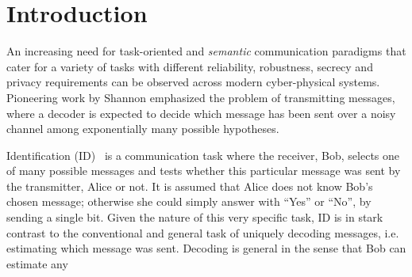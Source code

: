\documentclass[conference,final]{IEEEtran}
\begin{document}
\begin{abstract}
An upper bound to the identification capacity of discrete memoryless wiretap channels is derived under the requirement of semantic effective secrecy, combining semantic secrecy and stealth constraints. A previously established lower bound is improved by applying it to a prefix channel, formed by concatenating an auxiliary channel and the actual channel. The bounds are tight if the legitimate channel is more capable than the eavesdropper's channel. An illustrative example is provided for a wiretap channel that is composed of a point-to-point channel, and a parallel, reversely degraded wiretap channel. A comparison with results for message transmission and for identification with only secrecy constraint is provided.
\end{abstract}

\section{Introduction}
An increasing need for task-oriented and \emph{semantic} communication paradigms
that cater for a variety of tasks with different reliability, robustness,
secrecy and privacy requirements can be observed across modern cyber-physical
systems\cite{Guenduez2023semantic,CabreraEA2021postShannon6G,RezwanCabreraFitzek2022funcomp}. Pioneering work by Shannon \cite{Shannon1948MathematicalTheoryCommunication} emphasized the problem of transmitting messages, where a decoder is expected to decide which message has been sent over a noisy channel among exponentially many possible hypotheses. 

Identification (ID)~\cite{Yao1979SomeComplexityQuestions_conference,
  JaJa1985Identificationiseasier_conference,
  AhlswedeDueck1989Identificationviachannels}
is  a communication task where the receiver, Bob, selects one
of many possible messages and tests whether this particular message
was sent by the transmitter, Alice or not.
It is assumed that Alice does not know Bob's chosen message;
otherwise she could simply answer with “Yes” or “No”, by sending a single bit.
Given the nature of this very specific task,
ID is in stark contrast to the
conventional and general task of uniquely decoding messages,
i.e. estimating which message was sent.
Decoding is general in the sense that Bob can estimate any
\end{document}
